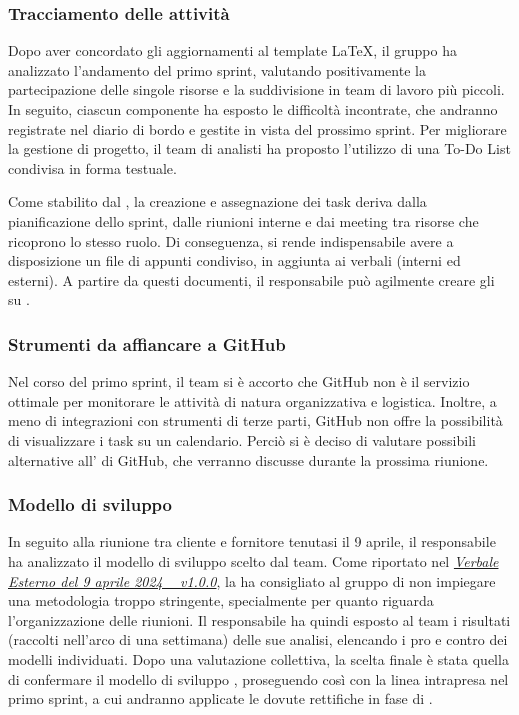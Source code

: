 \subsubsection{Tracciamento delle attività}
\par Dopo aver concordato gli aggiornamenti al template LaTeX, il gruppo ha analizzato l'andamento del primo sprint, valutando positivamente la partecipazione delle singole risorse e la suddivisione in team di lavoro più piccoli. In seguito, ciascun componente ha esposto le difficoltà incontrate, che andranno registrate nel diario di bordo e gestite in vista del prossimo sprint. Per migliorare la gestione di progetto, il team di analisti ha proposto l’utilizzo di una To-Do List condivisa in forma testuale.
\par Come stabilito dal \glossario{\WoW}, la creazione e assegnazione dei task deriva dalla pianificazione dello sprint, dalle riunioni interne e dai meeting tra risorse che ricoprono lo stesso ruolo. Di conseguenza, si rende indispensabile avere a disposizione un file di appunti condiviso, in aggiunta ai verbali (interni ed esterni). A partire da questi documenti, il responsabile può agilmente creare gli  su .

\subsubsection{Strumenti da affiancare a GitHub}
\par Nel corso del primo sprint, il team si è accorto che GitHub non è il servizio ottimale per monitorare le attività di natura organizzativa e logistica. Inoltre, a meno di integrazioni con strumenti di terze parti, GitHub non offre la possibilità di visualizzare i task su un calendario. Perciò si è deciso di valutare possibili alternative all' di GitHub, che verranno discusse durante la prossima riunione.

\subsubsection{Modello di sviluppo}
\par In seguito alla riunione tra cliente e fornitore tenutasi il 9 aprile, il responsabile ha analizzato il modello di sviluppo scelto dal team. Come riportato nel \href{https://argo-swe.github.io/2 - RTB/Verbali/Esterni/VerbaleEsterno_2024-04-09.pdf}{\emph{Verbale Esterno del 9 aprile 2024 \  v1.0.0}}, la  ha consigliato al gruppo di non impiegare una metodologia troppo stringente, specialmente per quanto riguarda l'organizzazione delle riunioni. Il responsabile ha quindi esposto al team i risultati (raccolti nell'arco di una settimana) delle sue analisi, elencando i pro e contro dei modelli individuati. Dopo una valutazione collettiva, la scelta finale è stata quella di confermare il modello di sviluppo , proseguendo così con la linea intrapresa nel primo sprint, a cui andranno applicate le dovute rettifiche in fase di .


